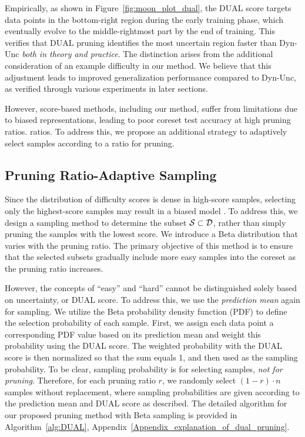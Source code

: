 Empirically, as shown in Figure~\ref{fig:moon_plot_dual}, the DUAL score targets data points in the bottom-right region during the early training phase, which eventually evolve to the middle-rightmost part by the end of training. This verifies that DUAL pruning identifies the most uncertain region faster than Dyn-Unc \emph{both in theory and practice}. The distinction arises from the additional consideration of an example difficulty in our method. We believe that this adjustment leads to improved generalization performance compared to Dyn-Unc, as verified through various experiments in later sections.

However, score-based methods, including our method, 
suffer from limitations due to biased representations, leading to poor coreset test accuracy at high pruning ratios. 
ratios. To address this, we propose an additional strategy to adaptively select samples according to a ratio for pruning.

\subsection{Pruning Ratio-Adaptive Sampling}
\label{sec:betapruning}
Since the distribution of difficulty scores is dense in high-score samples, selecting only the highest-score samples may result in a biased model \citep{zhou2023probabilisticbilevelcoresetselection, maharana2023d2, choi2024bws}.
To address this, we design a sampling method to determine the subset ${\mathcal{S}}\subset{\mathcal{D}}$, rather than simply pruning the samples with the lowest score. We introduce a Beta distribution that varies with the pruning ratio. The primary objective of this method is to ensure that the selected subsets gradually include more easy samples into the coreset as the pruning ratio increases.

However, the concepts of ``easy'' and ``hard'' cannot be distinguished solely based on uncertainty, or DUAL score. To address this, we use the \emph{prediction mean} again for sampling. 
We utilize the Beta probability density function (PDF) to define the selection probability of each sample.
First, we assign each data point a corresponding PDF value based on its prediction mean and weight this probability using the DUAL score. The weighted probability with the DUAL score is then normalized so that the sum equals 1, and then used as the sampling probability. To be clear, sampling probability is for selecting samples, \emph{not for pruning}. Therefore, for each pruning ratio 
$r$, we randomly select $(1-r)\cdot n$ samples without replacement, where sampling probabilities are given according to the prediction mean and DUAL score as described. The detailed algorithm for our proposed pruning method with Beta sampling is provided in Algorithm~\ref{alg:DUAL}, Appendix~\ref{Appendix_explanation_of_dual_pruning}.

